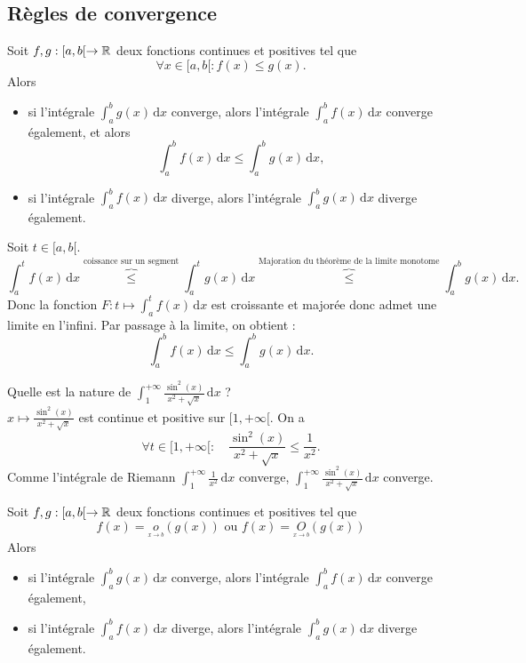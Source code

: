 \documentclass{book}
\begin{document}
\subsection{Règles de convergence}
\begin{Theoreme}
Soit $f,g:[a,b[\to\mathbb{R}$ deux fonctions continues et positives tel que
$$\forall x\in [a,b[: f(x)\leq g(x).$$ 
Alors 
\begin{itemize}
\item
  si l'intégrale $\int_a^b g(x)\,\mathrm dx$ converge, alors l'intégrale $\int_a^b f(x)\,\mathrm dx$ converge également, et alors 
  $$  \int_a^b f(x)\,\mathrm dx \leq \int_a^b g(x)\,\mathrm dx,$$
\item
  si l'intégrale $\int_a^b f(x)\,\mathrm dx$ diverge, alors l'intégrale $\int_a^b g(x)\,\mathrm dx$ diverge également.
\end{itemize}
\end{Theoreme}
\begin{Demonstration}
Soit $t\in[a,b[$.
$$ \int_a^t f(x)\,\mathrm dx\overbrace{\leq}^{\text{coissance sur un segment}}\int_a^t g(x)\,\mathrm dx\overbrace{\leq}^{\text{Majoration du théorème de la limite monotome}}\int_a^b g(x)\,\mathrm dx.$$
Donc la fonction $F:t\mapsto \int_a^t f(x)\,\mathrm dx$ est croissante et majorée donc admet une limite en l'infini. Par passage à la limite, on  obtient : 
 $$  \int_a^b f(x)\,\mathrm dx \leq \int_a^b g(x)\,\mathrm dx.$$
\end{Demonstration}
\begin{Exemple}
Quelle est la nature de $\int_1^{+\infty}\frac{\sin^2(x)}{x^2+\sqrt{x}}  \,\mathrm dx$ ?\\
$x\mapsto \frac{\sin^2(x)}{x^2+\sqrt{x}}$ est continue et positive  sur $[1,+\infty[$. 
On a  
$$\forall t\in [1,+\infty[ :\quad  \frac{\sin^2(x)}{x^2+\sqrt{x}}\leq \frac{1}{x^2}.$$
Comme l'intégrale de Riemann $\int_1^{+\infty}\frac{1}{x^2 }\,\mathrm dx$ converge, $\int_1^{+\infty}\frac{\sin^2(x)}{x^2+\sqrt{x}}  \,\mathrm dx$ converge.\\
\end{Exemple}
\begin{Theoreme}
Soit $f,g:[a,b[\to\mathbb{R}$ deux fonctions continues et positives tel que
$$ f(x)=\underset{ \overset { x \rightarrow b } {} } {o}(g(x))\text{ ou  }f(x)=\underset{ \overset { x \rightarrow b } {} } {O}(g(x))$$ 
Alors 
\begin{itemize}
\item
  si l'intégrale $\int_a^b g(x)\,\mathrm dx$ converge, alors l'intégrale $\int_a^b f(x)\,\mathrm dx$ converge également,
\item
  si l'intégrale $\int_a^b f(x)\,\mathrm dx$ diverge, alors l'intégrale $\int_a^b g(x)\,\mathrm dx$ diverge également.
\end{itemize}
\end{Theoreme}
\end{document}
